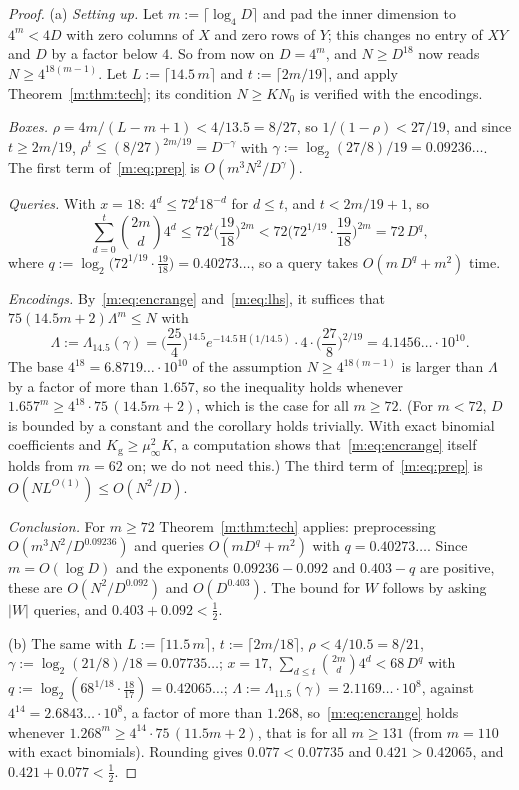 \documentclass[11pt]{article}
\theoremstyle{definition}
\theoremstyle{remark}
\newcommand{\Hh}{\mathrm{H}}
\newcommand{\Nz}{N_0}
\newcommand{\Kg}{K_{\mathrm g}}
\begin{document}
\begin{proof}
(a) \emph{Setting up.} Let $m:=\lceil\log_4D\rceil$ and pad the inner dimension to $4^m<4D$ with zero columns of $X$ and zero rows of $Y$; this changes no entry of $XY$ and $D$ by a factor below $4$. So from now on $D=4^m$, and $N\ge D^{18}$ now reads $N\ge4^{18(m-1)}$. Let $L:=\lceil14.5\,m\rceil$ and $t:=\lceil2m/19\rceil$, and apply Theorem~\ref{m:thm:tech}; its condition $N\ge K\Nz$ is verified with the encodings.

\emph{Boxes.} $\rho=4m/(L-m+1)<4/13.5=8/27$, so $1/(1-\rho)<27/19$, and since $t\ge2m/19$, $\rho^t\le(8/27)^{2m/19}=D^{-\gamma}$ with $\gamma:=\log_2(27/8)/19=0.09236\ldots$. The first term of~\eqref{m:eq:prep} is $O(m^3N^2/D^\gamma)$.

\emph{Queries.} With $x=18$: $4^d\le72^t18^{-d}$ for $d\le t$, and $t<2m/19+1$, so
\[
\sum_{d=0}^{t}\binom{2m}d4^d\le72^t\Big(\frac{19}{18}\Big)^{2m}<72\Big(72^{1/19}\cdot\frac{19}{18}\Big)^{2m}=72\,D^{q},
\]
where $q:=\log_2\big(72^{1/19}\cdot\frac{19}{18}\big)=0.40273\ldots$,
so a query takes $O(m\,D^q+m^2)$ time.

\emph{Encodings.} By~\eqref{m:eq:encrange} and~\eqref{m:eq:lhs}, it suffices that $75(14.5m+2)\Lambda^m\le N$ with
\[
\Lambda:=\Lambda_{14.5}(\gamma)=\Big(\frac{25}4\Big)^{14.5}e^{-14.5\,\Hh(1/14.5)}\cdot4\cdot\Big(\frac{27}8\Big)^{2/19}=4.1456\ldots\cdot10^{10}.
\]
The base $4^{18}=6.8719\ldots\cdot10^{10}$ of the assumption $N\ge4^{18(m-1)}$ is larger than $\Lambda$ by a factor of more than $1.657$, so the inequality holds whenever $1.657^m\ge4^{18}\cdot75\,(14.5m+2)$, which is the case for all $m\ge72$. (For $m<72$, $D$ is bounded by a constant and the corollary holds trivially. With exact binomial coefficients and $\Kg\ge\mu_\infty^2 K$, a computation shows that~\eqref{m:eq:encrange} itself holds from $m=62$ on; we do not need this.) The third term of~\eqref{m:eq:prep} is $O(NL^{O(1)})\le O(N^2/D)$.

\emph{Conclusion.} For $m\ge72$ Theorem~\ref{m:thm:tech} applies: preprocessing $O(m^3N^2/D^{0.09236})$ and queries $O(mD^{q}+m^2)$ with $q=0.40273\ldots$. Since $m=O(\log D)$ and the exponents $0.09236-0.092$ and $0.403-q$ are positive, these are $O(N^2/D^{0.092})$ and $O(D^{0.403})$. The bound for $W$ follows by asking $|W|$ queries, and $0.403+0.092<\frac12$.

(b) The same with $L:=\lceil11.5\,m\rceil$, $t:=\lceil2m/18\rceil$, $\rho<4/10.5=8/21$, $\gamma:=\log_2(21/8)/18=0.07735\ldots$; $x=17$, $\sum_{d\le t}\binom{2m}d4^d<68\,D^{q}$ with $q:=\log_2(68^{1/18}\cdot\frac{18}{17})=0.42065\ldots$; $\Lambda:=\Lambda_{11.5}(\gamma)=2.1169\ldots\cdot10^8$, against $4^{14}=2.6843\ldots\cdot10^8$, a factor of more than $1.268$, so~\eqref{m:eq:encrange} holds whenever $1.268^m\ge4^{14}\cdot75\,(11.5m+2)$, that is for all $m\ge131$ (from $m=110$ with exact binomials). Rounding gives $0.077<0.07735$ and $0.421>0.42065$, and $0.421+0.077<\frac12$.
\end{proof}
\end{document}
